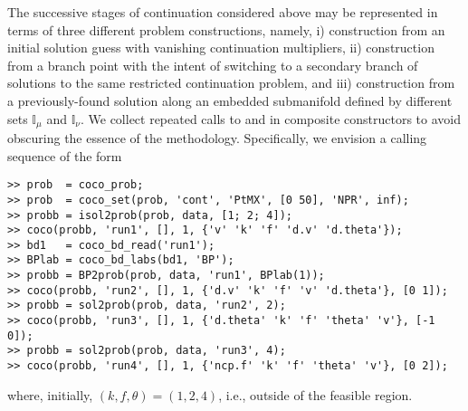 The successive stages of continuation considered above may be represented in terms of three different problem constructions, namely, i) construction from an initial solution guess with vanishing continuation multipliers, ii) construction from a branch point with the intent of switching to a secondary branch of solutions to the same restricted continuation problem, and iii) construction from a previously-found solution along an embedded submanifold defined by different sets $\mathbb{I}_\mu$ and $\mathbb{I}_\nu$. We collect repeated calls to  and  in composite constructors to avoid obscuring the essence of the methodology. Specifically, we envision a calling sequence of the form
\begin{lstlisting}[language=coco-highlight]
>> prob  = coco_prob;
>> prob  = coco_set(prob, 'cont', 'PtMX', [0 50], 'NPR', inf);
>> probb = isol2prob(prob, data, [1; 2; 4]);
>> coco(probb, 'run1', [], 1, {'v' 'k' 'f' 'd.v' 'd.theta'});
>> bd1   = coco_bd_read('run1');
>> BPlab = coco_bd_labs(bd1, 'BP');
>> probb = BP2prob(prob, data, 'run1', BPlab(1));
>> coco(probb, 'run2', [], 1, {'d.v' 'k' 'f' 'v' 'd.theta'}, [0 1]);
>> probb = sol2prob(prob, data, 'run2', 2);
>> coco(probb, 'run3', [], 1, {'d.theta' 'k' 'f' 'theta' 'v'}, [-1 0]);
>> probb = sol2prob(prob, data, 'run3', 4);
>> coco(probb, 'run4', [], 1, {'ncp.f' 'k' 'f' 'theta' 'v'}, [0 2]);
\end{lstlisting}
where, initially, $(k,f,\theta)=(1,2,4)$, i.e., outside of the feasible region. 

